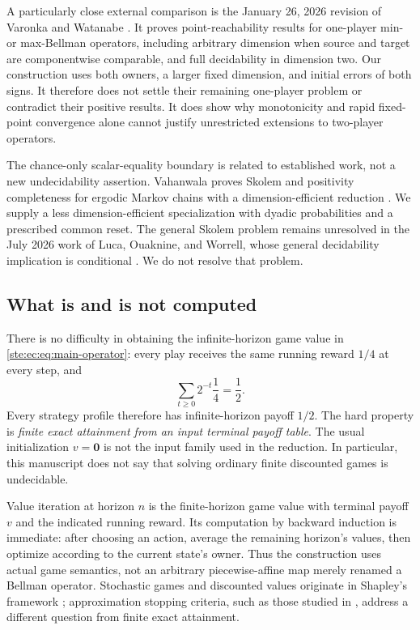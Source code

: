 \documentclass[11pt,letterpaper]{article}
\theoremstyle{definition}
\theoremstyle{remark}
\newcommand{\zero}{\mathbf 0}
\begin{document}
A particularly close external comparison is the January 26, 2026 revision
of Varonka and Watanabe \cite{varonka}. It proves point-reachability
results for one-player min- or max-Bellman operators, including arbitrary
dimension when source and target are componentwise comparable, and full
decidability in dimension two. Our construction uses both owners, a larger
fixed dimension, and initial errors of both signs. It therefore does not
settle their remaining one-player problem or contradict their positive
results. It does show why monotonicity and rapid fixed-point convergence
alone cannot justify unrestricted extensions to two-player operators.

The chance-only scalar-equality boundary is related to established work,
not a new undecidability assertion. Vahanwala proves Skolem and positivity
completeness for ergodic Markov chains with a dimension-efficient reduction
\cite{vahanwala}. We supply a less dimension-efficient specialization with
dyadic probabilities and a prescribed common reset. The general Skolem
problem remains unresolved in the July 2026 work of Luca, Ouaknine, and
Worrell, whose general decidability implication is conditional
\cite{skolem2026}. We do not resolve that problem.

\subsection{What is and is not computed}

There is no difficulty in obtaining the infinite-horizon game value in
\eqref{ste:ec:eq:main-operator}: every play receives the same running reward $1/4$
at every step, and
\[
 \sum_{t\geq0}2^{-t}\frac14=\frac12.
\]
Every strategy profile therefore has infinite-horizon payoff $1/2$.
The hard property is \emph{finite exact attainment from an input terminal
payoff table}. The usual initialization $v=\zero$ is not the input family
used in the reduction. In particular, this manuscript does not say that
solving ordinary finite discounted games is undecidable.

Value iteration at horizon $n$ is the finite-horizon game value with terminal
payoff $v$ and the indicated running reward. Its computation by backward
induction is immediate: after choosing an action, average the remaining
horizon's values, then optimize according to the current state's owner.
Thus the construction uses actual game semantics, not an arbitrary
piecewise-affine map merely renamed a Bellman operator. Stochastic games
and discounted values originate in Shapley's framework \cite{shapley};
approximation stopping criteria, such as those studied in
\cite{grobelna}, address a different question from finite exact attainment.
\end{document}
